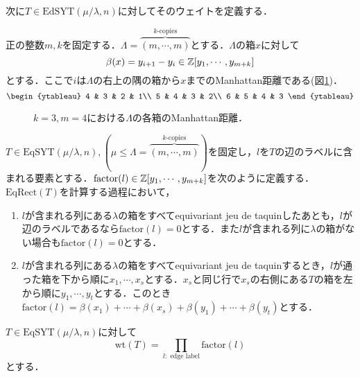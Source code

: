次に$T\in\text{EdSYT}(\mu/\lambda, n)$に対してそのウェイトを定義する．

\begin{defin}
  正の整数$m, k$を固定する．$\Lambda=\overbrace{(m,\cdots,m)}^{k\text{-copies}}$とする．$\Lambda$の箱$x$に対して
  \[
  \beta(x)=y_{i+1}-y_i\in \mathbb{Z}[y_1,\cdots,y_{m+k}]
  \]
  とする．ここで$i$は$\Lambda$の右上の隅の箱から$x$までのManhattan距離である(図\ref{manhattan})．
  \[
  \begin{ytableau}
    4 & 3 & 2 & 1\\
    5 & 4 & 3 & 2\\
    6 & 5 & 4 & 3
  \end{ytableau}
  \]
  \begin{figure}[H]
    \centering
    \caption{$k=3,m=4$における$\Lambda$の各箱のManhattan距離．}\label{manhattan}
  \end{figure}
\end{defin}

\begin{defin}
  $T\in\text{EqSYT}(\mu/\lambda, n), (\mu\leq\Lambda=\overbrace{(m,\cdots,m)}^{k\text{-copies}})$を固定し，$l$を$T$の辺のラベルに含まれる要素とする．$\text{factor}(l)\in\mathbb{Z}[y_1,\cdots,y_{m+k}]$を次のように定義する．$\text{EqRect}(T)$を計算する過程において，
  \begin{enumerate}
    \item $l$が含まれる列にある$\lambda$の箱をすべてequivariant jeu de taquinしたあとも，$l$が辺のラベルであるなら$\text{factor}(l)=0$とする．また$l$が含まれる列に$\lambda$の箱がない場合も$\text{factor}(l)=0$とする．
    \item $l$が含まれる列にある$\lambda$の箱をすべてequivariant jeu de taquinするとき，$l$が通った箱を下から順に$x_1,\cdots,x_s$とする．$x_s$と同じ行で$x_s$の右側にある$T$の箱を左から順に$y_1,\cdots,y_t$とする．このとき$\text{factor}(l)=\beta(x_1)+\cdots+\beta(x_s)+\beta(y_1)+\cdots+\beta(y_t)$とする．
  \end{enumerate}
\end{defin}

\begin{defin}
  $T\in\text{EqSYT}(\mu/\lambda, n)$に対して
  \[
  \text{wt}(T)=\prod_{l:\text{ edge label}}\text{factor}(l)
  \]
  とする．
\end{defin}

